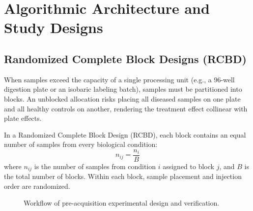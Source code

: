 \documentclass[11pt,twoside,openright]{book}
\begin{document}
\section{Algorithmic Architecture and Study Designs}

\subsection{Randomized Complete Block Designs (RCBD)}

When samples exceed the capacity of a single processing unit (e.g., a 96-well digestion plate or an isobaric labeling batch), samples must be partitioned into blocks. An unblocked allocation risks placing all diseased samples on one plate and all healthy controls on another, rendering the treatment effect collinear with plate effects.

In a Randomized Complete Block Design (RCBD), each block contains an equal number of samples from every biological condition:
\begin{equation}
n_{ij} = \frac{n_i}{B}
\end{equation}
where $n_{ij}$ is the number of samples from condition $i$ assigned to block $j$, and $B$ is the total number of blocks. Within each block, sample placement and injection order are randomized.

\begin{figure}[ht]
\centering
{}
\caption{Workflow of pre-acquisition experimental design and verification.}
\label{fig:design_flowchart}
\end{figure}
\end{document}
